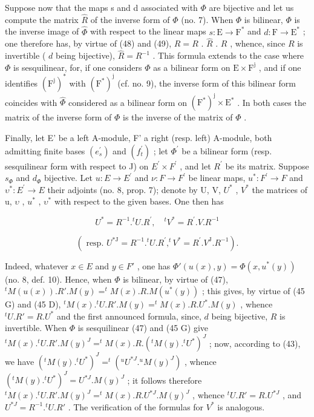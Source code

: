 Suppose now that the maps s and d associated with \(\Phi\) are bijective and let us compute the matrix \(\hat{R}\) of the inverse form of \(\Phi\) (no. 7). When \(\Phi\) is bilinear, \(\Phi\) is the inverse image of \(\hat{\Phi}\) with respect to the linear maps \(s: \mathrm{E} \to \mathrm{F}^*\) and \(d: \mathrm{F} \to \mathrm{E}^*\) ; one therefore has, by virtue of (48) and (49), \(R = R\) . \(\hat{R}\) . \(R\) , whence, since \(R\) is invertible ( \(d\) being bijective), \(\hat{R} = R^{-1}\) . This formula extends to the case where \(\Phi\) is sesquilinear, for, if one considers \(\Phi\) as a bilinear form on \(\mathrm{E} \times \mathrm{F}^{\mathrm{j}}\) , and if one identifies \((\mathrm{F}^{\mathrm{j}})^{*}\) with \((\mathrm{F}^{*})^{\mathrm{j}}\) (cf. no. 9), the inverse form of this bilinear form coincides with \(\hat{\Phi}\) considered as a bilinear form on \((\mathrm{F}^{*})^{\mathrm{j}} \times \mathrm{E}^{*}\) . In both cases the matrix of the inverse form of \(\Phi\) is the inverse of the matrix of \(\Phi\) .

Finally, let E' be a left A-module, F' a right (resp. left) A-module, both admitting finite bases \((e_{s}^{\prime})\) and \((f_{t}^{\prime})\) ; let \(\Phi^{\prime}\) be a bilinear form (resp. sesquilinear form with respect to J) on \(E^{\prime} \times F^{\prime}\) , and let \(R^{\prime}\) be its matrix. Suppose \(s_{\Phi}\) and \(d_{\Phi}\) bijective. Let \(u : E \to E^{\prime}\) and \(\nu : F \to F^{\prime}\) be linear maps, \(u^{*} : F^{\prime} \to F\) and \(\upsilon^{*} : E^{\prime} \to E\) their adjoints (no. 8, prop. 7); denote by U, V, \(U^{*}\) , \(V^{*}\) the matrices of u, \(\upsilon\) , \(u^{*}\) , \(\upsilon^{*}\) with respect to the given bases. One then has

\[
U ^ {*} = R ^ {- 1}. ^ {t} U. R ^ {\prime}, \quad {} ^ {t} V ^ {*} = R ^ {\prime}. V. R ^ {- 1}\tag{50}
\]

\[
(\text { resp. } U ^ {* \mathrm{J}} = R ^ {- 1}. ^ {t} U. R ^ {\prime}, ^ {t} V ^ {*} = R ^ {\prime}. V ^ {\mathrm{J}}. R ^ {- 1}).
\]

Indeed, whatever \(x \in E\) and \(y \in F'\) , one has \(\Phi'(u(x), y) = \Phi(x, u^*(y))\) (no. 8, def. 10). Hence, when \(\Phi\) is bilinear, by virtue of (47), \(^t M(u(x)). R'. M(y) = ^t M(x). R. M(u^*(y))\) ; this gives, by virtue of (45 G) and (45 D), \(^t M(x). ^t U. R'. M(y) = ^t M(x). R. U^*. M(y)\) , whence \(^t U. R' = R. U^*\) and the first announced formula, since, \(d\) being bijective, \(R\) is invertible. When \(\Phi\) is sesquilinear (47) and (45 G) give \(^t M(x). ^t U. R'. M(y)^J = ^t M(x). R. (^{t}M(y). ^{t}U^*)^{J}\) ; now, according to (43), we have \((^{t}M(y). ^{t}U^*)^{J} = ^{t}(^{u}U^{*J}. ^{u}M(y)^{J})\) , whence \((^{t}M(y). ^{t}U^*)^{J} = U^{*J}. M(y)^{J}\) ; it follows therefore \(^t M(x). ^{t}U. R'. M(y)^{J} = ^{t}M(x). R. U^{*J}. M(y)^{J}\) , whence \(^t U. R' = R. U^{*J}\) , and \(U^{*J} = R^{-1}. ^{t}U. R'\) . The verification of the formulas for \(V^*\) is analogous.

